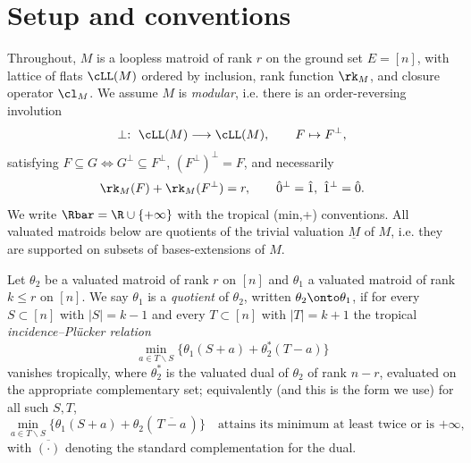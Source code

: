 \section{Setup and conventions}


\begin{convention}
Throughout, $M$ is a loopless matroid of rank $r$ on the ground set $E=[n]$,
with lattice of flats $\cLL(M)$ ordered by inclusion, rank function
$\rk_M$, and closure operator $\cl_M$. We assume $M$ is \emph{modular}, i.e.
there is an order-reversing involution
\[
\perp:\ \cLL(M)\longrightarrow \cLL(M),\qquad F\mapsto F^\perp,
\]
satisfying $F\subseteq G\iff G^\perp\subseteq F^\perp$, $(F^\perp)^\perp=F$, and
necessarily
\[
\rk_M(F)+\rk_M(F^\perp)=r,\qquad \hat 0^\perp=\hat 1,\ \hat 1^\perp=\hat 0 .
\]
We write $\Rbar=\R\cup\{+\infty\}$ with the tropical (min,+) conventions. All
valuated matroids below are quotients of the trivial valuation $\underline M$ of
$M$, i.e. they are supported on subsets of bases-extensions of $M$.
\end{convention}


\begin{definition}\label{def:quotient}
Let $\theta_2$ be a valuated matroid of rank $r$ on $[n]$ and $\theta_1$ a
valuated matroid of rank $k\le r$ on $[n]$. We say $\theta_1$ is a
\emph{quotient} of $\theta_2$, written $\theta_2\onto\theta_1$, if for every
$S\subset[n]$ with $|S|=k-1$ and every $T\subset[n]$ with $|T|=k+1$ the tropical
\emph{incidence--Pl\"ucker relation}
\begin{equation}\label{eqn:incidence-plucker}
\min_{a\in T\smallsetminus S}\bigl\{\theta_1(S+a)+\theta_2^{*}(T-a)\bigr\}
\end{equation}
vanishes tropically, where $\theta_2^{*}$ is the valuated dual of $\theta_2$ of
rank $n-r$, evaluated on the appropriate complementary set; equivalently (and
this is the form we use) for all such $S,T$,
\begin{equation}\label{eqn:ip2}
\min_{a\in T\smallsetminus S}\bigl\{\theta_1(S+a)+\theta_2(\,\overline{T-a}\,)\bigr\}
\quad\text{attains its minimum at least twice or is $+\infty$,}
\end{equation}
with $\overline{(\cdot)}$ denoting the standard complementation for the dual.
\end{definition}

